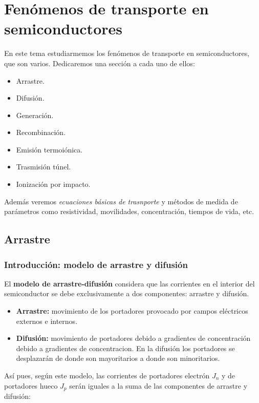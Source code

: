 \chapter{Fenómenos de transporte en semiconductores}




En este tema estudiarmemos los fenómenos de transporte en semiconductores, que son varios. Dedicaremos una sección a cada uno de ellos:

\begin{itemize}
	\item Arrastre.
	\item Difusión.
	\item Generación.
	\item Recombinación.
	\item Emisión termoiónica.
	\item Trasmisión túnel.
	\item Ionización por impacto.
\end{itemize} 
Además veremos \textit{ecuaciones básicas de trasnporte} y métodos de medida de parámetros como resistividad, movilidades, concentración, tiempos de vida, etc.

\section{Arrastre}

\subsection{Introducción: modelo de arrastre y difusión}

El \textbf{modelo de arrastre-difusión} considera que las corrientes en el interior del semiconductor se debe exclusivamente a dos componentes: arrastre y difusión. 

\begin{itemize}
	\item \textbf{Arrastre:} movimiento de los portadores provocado por campos eléctricos externos e internos.
	\item \textbf{Difusión:} movimiento de portadores debido a gradientes de concentración debido a gradientes de concentracion. En la difusión los portadores se desplazarán de donde son mayoritarios a donde son minoritarios.
\end{itemize}
Así pues, según este modelo, las corrientes de portadores electrón $J_n$ y de portadores hueco $J_p$ serán iguales a la suma de las componentes de arrastre y difusión:

